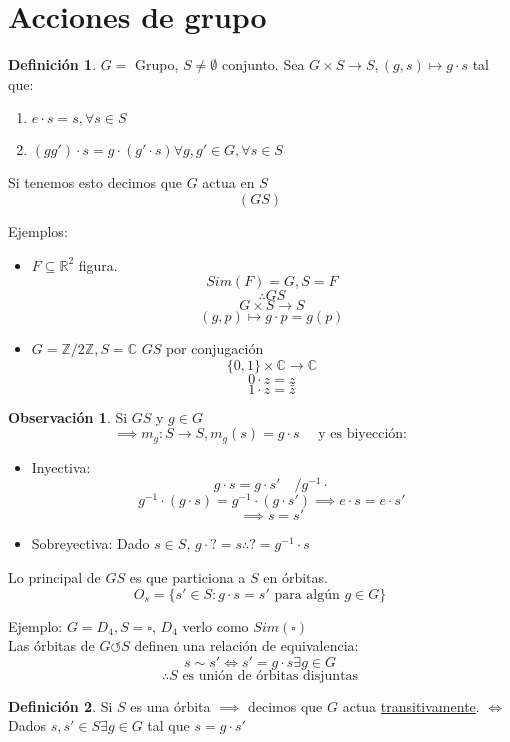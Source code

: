 \documentclass[11pt]{book}
\theoremstyle{definition}
\newtheorem{defn}{Definición}[section]
\newtheorem{obs}{Observación}[section]
\begin{document}
\section{Acciones de grupo}
\begin{defn}
	$G=$ Grupo, $S\neq\emptyset$ conjunto. Sea $G\times S\rightarrow S,(g,s)\mapsto g\cdot s$ tal que:
	\begin{enumerate}[label=(\alph*)]
		\item $e\cdot s= s,\forall s\in S$

		\item $(gg')\cdot s=g\cdot(g'\cdot s)\forall g,g'\in G,\forall s\in S$
	\end{enumerate}
	Si tenemos esto decimos que $G$ actua en $S$
	\[(G S)\]
\end{defn}
Ejemplos:
\begin{itemize}
	\item $F\subseteq\mathbb{R}^2$ figura.
	\[Sim(F)=G, S=F\]
	\[\therefore G S\]
	\[G\times S\rightarrow S\]
	\[(g,p)\mapsto g\cdot p=g(p)\]

	\item $G=\mathbb{Z}/2\mathbb{Z}, S=\mathbb{C}$
	$G S$ por conjugación
	\[\{0,1\}\times\mathbb{C}\rightarrow\mathbb{C}\]
	\[0\cdot z= z\]
	\[1\cdot z=\bar{z}\]
	
\end{itemize}
\begin{obs}
	Si $G S$ y $g\in G$
	\[\implies m_g:S\rightarrow S, m_g(s)=g\cdot s\quad\textrm{ y es biyección:}\]
	\begin{itemize}
		\item Inyectiva: 
		\[g\cdot s=g\cdot s'\quad /g^{-1}\cdot\]
		\[g^{-1}\cdot (g\cdot s)=g^{-1}\cdot (g\cdot s')\implies e\cdot s=e\cdot s'\]
		\[\implies s=s'\]

		\item Sobreyectiva: Dado $s\in S$, $g\cdot ?=s\therefore ?=g^{-1}\cdot s$
	\end{itemize}
	
	Lo principal de $G S$ es que particiona a $S$ en órbitas.
	\[O_s=\{s'\in S:g\cdot s=s'\textrm{ para algún }g\in G\}\]
\end{obs}
Ejemplo: $G=D_4, S=\square$, $D_4$ verlo como $Sim(\square)$\\
Las órbitas de $G\circlearrowleft S$ definen una relación de equivalencia:
\[s\sim s'\iff s'=g\cdot s\exists g\in G\]
\[\therefore S\textrm{ es unión de órbitas disjuntas}\]
\begin{defn}
	Si $S$ es una órbita $\implies$ decimos que $G$ actua \underline{transitivamente}. $\iff$ Dados $s,s'\in S\exists g\in G$ tal que $s=g\cdot s'$
\end{defn}
\end{document}
